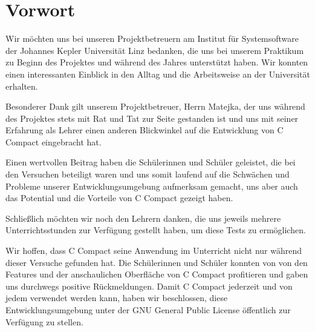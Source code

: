 

\chapter*{Vorwort}



Wir möchten uns bei unseren Projektbetreuern am Institut für Systemsoftware der Johannes Kepler Universität Linz bedanken, die uns bei unserem Praktikum zu Beginn des Projektes und während des Jahres unterstützt haben. Wir konnten einen interessanten Einblick in den Alltag und die Arbeitsweise an der Universität erhalten.

Besonderer Dank gilt unserem Projektbetreuer, Herrn Matejka, der uns während des Projektes stets mit Rat und Tat zur Seite gestanden ist und uns mit seiner Erfahrung als Lehrer einen anderen Blickwinkel auf die Entwicklung von C Compact eingebracht hat.

Einen wertvollen Beitrag haben die Schülerinnen und Schüler geleistet, die bei den Versuchen beteiligt waren und uns somit laufend auf die Schwächen und Probleme unserer Entwicklungsumgebung aufmerksam gemacht, uns aber auch das Potential und die Vorteile von C Compact gezeigt haben.

Schließlich möchten wir noch den Lehrern danken, die uns jeweils mehrere Unterrichtsstunden zur Verfügung gestellt haben, um diese Tests zu ermöglichen.

Wir hoffen, dass C Compact seine Anwendung im Unterricht nicht nur während dieser Versuche gefunden hat. Die Schülerinnen und Schüler konnten von von den Features und der anschaulichen Oberfläche von C Compact profitieren und gaben uns durchwegs positive Rückmeldungen. Damit C Compact jederzeit und von jedem verwendet werden kann, haben wir beschlossen, diese Entwicklungsumgebung unter der GNU General Public License öffentlich zur Verfügung zu stellen.